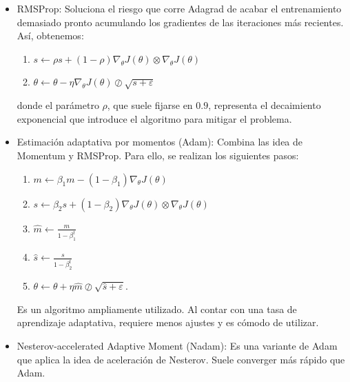 \begin{itemize}
    \item RMSProp: Soluciona el riesgo que corre Adagrad de acabar el entrenamiento demasiado pronto acumulando los gradientes de las iteraciones más recientes. Así,  obtenemos:
    \begin{enumerate}
        \item $s \leftarrow \rho s + (1-\rho) \nabla_\theta J(\theta)\otimes \nabla_\theta J(\theta) $
        \item $\theta \leftarrow \theta -\eta \nabla_\theta J(\theta)\oslash\sqrt{s+\varepsilon}$
    \end{enumerate}
    donde el parámetro $\rho$, que suele fijarse en $0.9$, representa el decaimiento exponencial que introduce el algoritmo para mitigar el problema. 

    \item Estimación adaptativa por momentos (Adam): Combina las idea de Momentum y RMSProp. Para ello, se realizan los siguientes pasos: 
    \begin{enumerate}
        \item $m \leftarrow \beta_1 m - (1-\beta_1) \nabla_\theta J(\theta) $
        \item $s \leftarrow \beta_2 s + (1-\beta_2) \nabla_\theta J(\theta)\otimes \nabla_\theta J(\theta) $
        \item $\hat{m} \leftarrow \frac{m}{1-\beta_1^t}$
            \item $\hat{s} \leftarrow \frac{s}{1-\beta_2^t}$
        \item $\theta \leftarrow \theta + \eta \hat{m} \oslash \sqrt{\hat{s}+\varepsilon}$.
    \end{enumerate}
    Es un algoritmo ampliamente utilizado. Al contar con una tasa de aprendizaje adaptativa, requiere menos ajustes y es cómodo de utilizar.  

    \item Nesterov-accelerated Adaptive Moment (Nadam): Es una variante de Adam que aplica la idea de aceleración de Nesterov. Suele converger más rápido que Adam. 

\end{itemize}